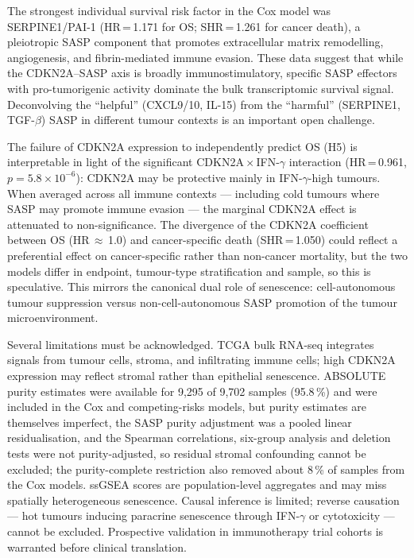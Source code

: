 \documentclass[10pt,twocolumn]{article}
\begin{document}
The strongest individual survival risk factor in the Cox model was
SERPINE1/PAI-1 (HR\,=\,1.171 for OS; SHR\,=\,1.261 for cancer death),
a pleiotropic SASP component that promotes extracellular matrix
remodelling, angiogenesis, and fibrin-mediated immune
evasion\cite{Alessi1997}. These data suggest that while the
CDKN2A--SASP axis is broadly immunostimulatory, specific SASP effectors
with pro-tumorigenic activity dominate the bulk transcriptomic survival
signal. Deconvolving the ``helpful'' (CXCL9/10, IL-15) from the
``harmful'' (SERPINE1, TGF-$\beta$) SASP in different tumour contexts is
an important open challenge.

The failure of CDKN2A expression to independently predict OS (H5) is
interpretable in light of the significant CDKN2A\,$\times$\,IFN-$\gamma$
interaction (HR\,=\,0.961, $p=5.8\times10^{-6}$): CDKN2A may be
protective mainly in IFN-$\gamma$-high tumours. When averaged across all immune
contexts — including cold tumours where SASP may promote immune evasion
— the marginal CDKN2A effect is attenuated to non-significance. The
divergence of the CDKN2A coefficient between OS (HR\,$\approx$\,1.0)
and cancer-specific death (SHR\,=\,1.050) could reflect a preferential
effect on cancer-specific rather than non-cancer mortality, but the two
models differ in endpoint, tumour-type stratification and sample, so this
is speculative. This mirrors the canonical dual role of senescence:
cell-autonomous tumour suppression versus non-cell-autonomous SASP
promotion of the tumour microenvironment\cite{Krtolica2001}.

Several limitations must be acknowledged. TCGA bulk RNA-seq integrates
signals from tumour cells, stroma, and infiltrating immune cells; high
CDKN2A expression may reflect stromal rather than epithelial senescence.
ABSOLUTE purity estimates were available for 9,295 of 9,702 samples
(95.8\,\%) and were included in the Cox and competing-risks models, but
purity estimates are themselves imperfect, the SASP purity adjustment was
a pooled linear residualisation, and the Spearman correlations, six-group
analysis and deletion tests were not purity-adjusted, so residual stromal
confounding cannot be excluded; the purity-complete restriction also
removed about 8\,\% of samples from the Cox models. ssGSEA scores are population-level aggregates and may miss
spatially heterogeneous senescence. Causal inference is limited;
reverse causation — hot tumours inducing paracrine senescence through
IFN-$\gamma$ or cytotoxicity\cite{Acosta2013} — cannot be excluded.
Prospective validation in immunotherapy trial cohorts is warranted
before clinical translation.
\end{document}

